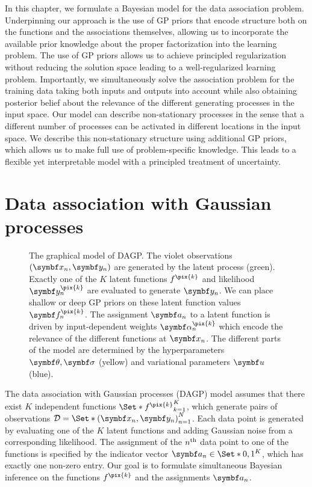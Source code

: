 In this chapter, we formulate a Bayesian model for the data association problem.
Underpinning our approach is the use of GP priors that encode structure both on the functions and the associations themselves, allowing us to incorporate the available prior knowledge about the proper factorization into the learning problem.
The use of GP priors allows us to achieve principled regularization without reducing the solution space leading to a well-regularized learning problem.
Importantly, we simultaneously solve the association problem for the training data taking both inputs and outputs into account while also obtaining posterior belief about the relevance of the different generating processes in the input space.
Our model can describe non-stationary processes in the sense that a different number of processes can be activated in different locations in the input space.
We describe this non-stationary structure using additional GP priors, which allows us to make full use of problem-specific knowledge.
This leads to a flexible yet interpretable model with a principled treatment of uncertainty.

\section{Data association with Gaussian processes}
\label{toc:data_association:model}
\begin{figure}[t]
    \centering
    
    \caption[Graphical model: Data association GP]{
    \label{fig:data_association:data_association_graphical_model}
    The graphical model of DAGP.
    The violet observations $(\mat{x}_n, \mat{y}_n)$ are generated by the latent process (green).
    Exactly one of the $K$ latent functions $f^{\pix{k}}$ and likelihood $\mat{y}_n^{\pix{k}}$ are evaluated to generate $\mat{y}_n$.
    We can place shallow or deep GP priors on these latent function values $\mat{f}_n^{\pix{k}}$.
    The assignment $\mat{a}_n$ to a latent function is driven by input-dependent weights $\mat{\alpha}_n^{\pix{k}}$ which encode the relevance of the different functions at $\mat{x}_n$.
    The different parts of the model are determined by the hyperparameters $\mat{\theta}, \mat{\sigma}$ (yellow) and variational parameters $\mat{u}$ (blue).
    }
\end{figure}
The data association with Gaussian processes (DAGP) model assumes that there exist $K$ independent functions $\Set*{f^{\pix{k}}}_{k=1}^K$, which generate pairs of observations $\Dc = \Set*{(\mat{x}_n, \mat{y}_n)}_{n=1}^N$.
Each data point is generated by evaluating one of the $K$ latent functions and adding Gaussian noise from a corresponding likelihood.
The assignment of the $n^{\text{th}}$ data point to one of the functions is specified by the indicator vector $\mat{a}_n \in \Set*{0, 1}^K$, which has exactly one non-zero entry.
Our goal is to formulate simultaneous Bayesian inference on the functions $f^{\pix{k}}$ and the assignments $\mat{a}_n$.

